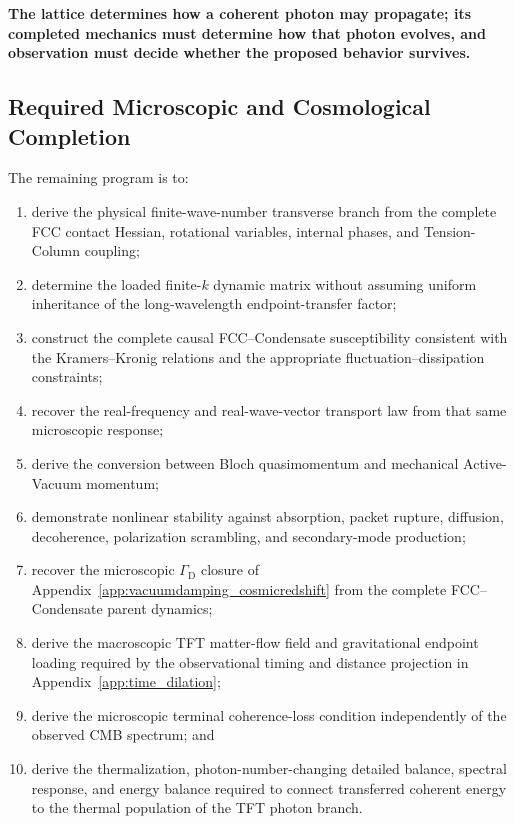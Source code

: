\medskip
\noindent\textbf{The lattice determines how a coherent
photon may propagate; its completed mechanics must
determine how that photon evolves, and observation
must decide whether the proposed behavior survives.}

\subsection{Required Microscopic and Cosmological Completion}
\label{subsec:photon_relaxation_remaining_completion}

The remaining program is to:

\begin{enumerate}
    \item derive the physical finite-wave-number transverse branch from the
    complete FCC contact Hessian, rotational variables, internal phases, and
    Tension-Column coupling;

    \item determine the loaded finite-\(k\) dynamic matrix without assuming
    uniform inheritance of the long-wavelength endpoint-transfer factor;

    \item construct the complete causal FCC--Condensate susceptibility
    consistent with the Kramers--Kronig relations and the appropriate
    fluctuation--dissipation constraints;

    \item recover the real-frequency and real-wave-vector transport law from
    that same microscopic response;

    \item derive the conversion between Bloch quasimomentum and mechanical
    Active-Vacuum momentum;

    \item demonstrate nonlinear stability against absorption, packet rupture,
    diffusion, decoherence, polarization scrambling, and secondary-mode
    production;

    \item recover the microscopic \(\Gamma_{\mathrm D}\) closure of
    Appendix~\ref{app:vacuumdamping_cosmicredshift} from the complete
    FCC--Condensate parent dynamics;

    \item derive the macroscopic TFT matter-flow field and gravitational
    endpoint loading required by the observational timing and distance
    projection in Appendix~\ref{app:time_dilation};

    \item derive the microscopic terminal coherence-loss condition
    independently of the observed CMB spectrum; and

    \item derive the thermalization, photon-number-changing detailed balance,
    spectral response, and energy balance required to connect transferred
    coherent energy to the thermal population of the TFT photon branch.
\end{enumerate}

